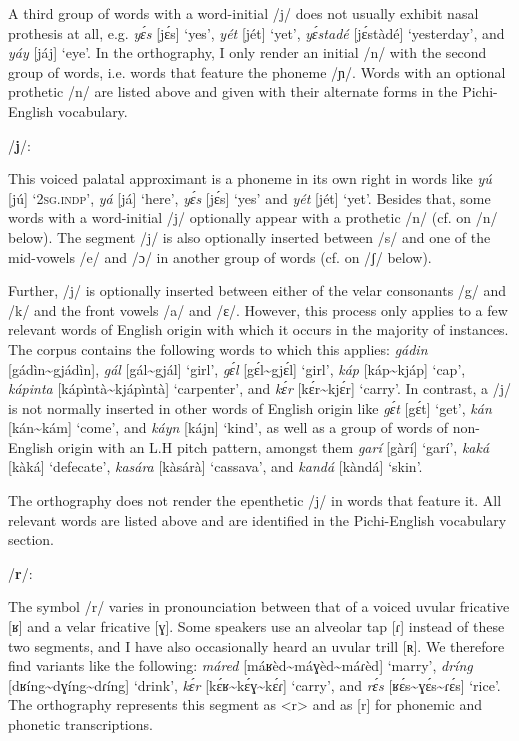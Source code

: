 A third group of words with a word-initial /j/ does not usually exhibit nasal prothesis at all, e.g. \textit{yɛ́s} [jɛ́s] ‘yes’, \textit{yét} [jét] ‘yet’, \textit{yɛ́stadé} [jɛ́stàdé] ‘yesterday’, and \textit{yáy} [jáj] ‘eye’. In the orthography, I only render an initial /n/ with the second group of words, i.e. words that feature the phoneme /ɲ/. Words with an optional prothetic /n/ are listed above and given with their alternate forms in the Pichi-English vocabulary.


/\textbf{j}/:

This voiced palatal approximant is a phoneme in its own right in words like \textit{yú} [jú] \textsc{‘2sg.indp’}, \textit{yá} [já] ‘here’, \textit{yɛ́s} [jɛ́s] ‘yes’ and \textit{yét} [jét] ‘yet’. Besides that, some words with a word-initial /j/ optionally appear with a prothetic /n/ (cf. on /n/ below). The segment /j/ is also optionally inserted between /s/ and one of the mid-vowels /e/ and /ɔ/ in another group of words (cf. on /ʃ/ below). {\fff}


Further, /j/ is optionally inserted between either of the velar consonants /g/ and /k/ and the front vowels /a/ and /ɛ/. However, this process only applies to a few relevant words of English origin with which it occurs in the majority of instances. The corpus contains the following words to which this applies: \textit{gádin} [gádìn{\textasciitilde}gjádìn], \textit{gál} [gál{\textasciitilde}gjál] ‘girl’, \textit{gɛ́l} [gɛ́l{\textasciitilde}gjɛ́l] ‘girl’, \textit{káp} [káp{\textasciitilde}kjáp] ‘cap’, \textit{kápinta} [kápìntà{\textasciitilde}kjápìntà] ‘carpenter’, and \textit{kɛ́r} [kɛ́r{\textasciitilde}kjɛ́r] ‘carry’. In contrast, a /j/ is not normally inserted in other words of English origin like \textit{gɛ́t} [gɛ́t] ‘get’, \textit{kán} [kán{\textasciitilde}kám] ‘come’, and \textit{káyn} [kájn] ‘kind’, as well as a group of words of non-English origin with an L.H pitch pattern, amongst them \textit{garí} [gàrí] ‘garí’, \textit{kaká} [kàká] ‘defecate’, \textit{kasára} [kàsárà] ‘cassava’, and \textit{kandá} [kàndá] ‘skin’. 



The orthography does not render the epenthetic /j/ in words that feature it. All relevant words are listed above and are identified in the Pichi-English vocabulary section. 


/\textbf{r}/:

The symbol /r/ varies in pronounciation between that of a voiced uvular fricative [ʁ] and a velar fricative [ɣ]. Some speakers use an alveolar tap [ɾ] instead of these two segments, and I have also occasionally heard an uvular trill [ʀ]. We therefore find variants like the following: \textit{máred} [máʁèd{\textasciitilde}máɣèd{\textasciitilde}máɾèd] ‘marry’, \textit{dríng} [dʁíng{\textasciitilde}dɣíng{\textasciitilde}dɾíng] ‘drink’, \textit{kɛ́r} [kɛ́ʁ{\textasciitilde}kɛ́ɣ{\textasciitilde}kɛ́ɾ] ‘carry’, and \textit{rɛ́s} [ʁɛ́s{\textasciitilde}ɣɛ́s{\textasciitilde}ɾɛ́s] ‘rice’. The orthography represents this segment as <r> and as [r] for phonemic and phonetic transcriptions.

